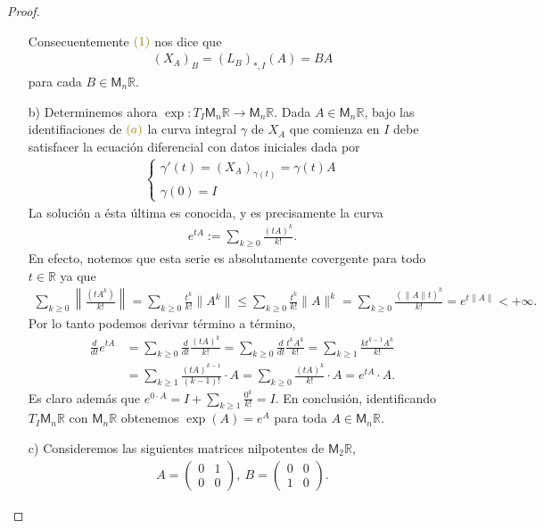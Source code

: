 \documentclass[11pt]{article}
\newcommand{\R}{\mathbb{R}}
\newcommand{\paint}[1]{\color{color}{#1}}
\begin{document}
\begin{proof}
\begin{itemize}[listparindent = \parindent]
Consecuentemente $\paint{(1)}$ nos dice que
\begin{align*}
(X_A)_B = (L_B)_{\ast,I}(A) = BA
\end{align*}
para cada $B \in \mathsf{M}_n\R$.
\item[b)] Determinemos ahora $\exp: T_I\mathsf{M}_n\R \to \mathsf{M}_n\R$. Dada $A \in \mathsf{M}_n\R$, bajo las identifiaciones de $\paint{(a)}$ la curva integral $\gamma$ de $X_A$ que comienza en $I$ debe satisfacer la ecuaci\'on diferencial con datos iniciales dada por
\begin{align}
\begin{cases}
\gamma'(t) = (X_A)_{\gamma(t)} = \gamma(t)A\\
\gamma(0) = I
\end{cases}
\end{align}
La soluci\'on a \'esta \'ultima es conocida, y es precisamente la curva
\begin{align*}
e^{tA} := \sum_{k \geq 0}\frac{(tA)^k}{k!}.
\end{align*}
En efecto, notemos que esta serie es absolutamente covergente para todo $t \in \R$ ya que
\begin{align*}
\sum_{k \geq 0}\left\|\frac{(tA^k)}{k!}\right\| = \sum_{k \geq 0}\frac{t^k}{k!}\|A^k\| \leq \sum_{k \geq 0}\frac{t^k}{k!}\|A\|^k = \sum_{k \geq 0}\frac{(\|A\|t)^k}{k!} = e^{t\|A\|} < + \infty.
\end{align*}
Por lo tanto podemos derivar t\'ermino a t\'ermino,
\begin{align*}
\frac{d}{dt}e^{tA} &= \sum_{k \geq 0}\frac{d}{dt}\frac{(tA)^k}{k!} = \sum_{k \geq 0}\frac{d}{dt}\frac{t^kA^k}{k!} = \sum_{k \geq 1}\frac{kt^{k-1}A^k}{k!}\\ 
&= \sum_{k \geq 1}\frac{(tA)^{k-1}}{(k-1)!} \cdot A = \sum_{k \geq 0}\frac{(tA)^{k}}{k!} \cdot A = e^{tA} \cdot A.
\end{align*}
Es claro adem\'as que $e^{0 \cdot A} = I + \sum_{k \geq 1}\frac{0^k}{k!} = I$. En conclusi\'on, identificando $T_I\mathsf{M}_n\R$ con $\mathsf{M}_n\R$ obtenemos $\exp(A) = e^A$ para toda $A \in \mathsf{M}_n\R$.
\item[c)] Consideremos las siguientes matrices nilpotentes de $\mathsf{M}_2\R$,
\begin{align*}
A = \begin{pmatrix}
0 & 1\\
0 & 0
\end{pmatrix}, \ B = \begin{pmatrix}
0 & 0\\
1 & 0
\end{pmatrix}.
\end{align*}


\end{itemize}
\end{proof}
\end{document}
